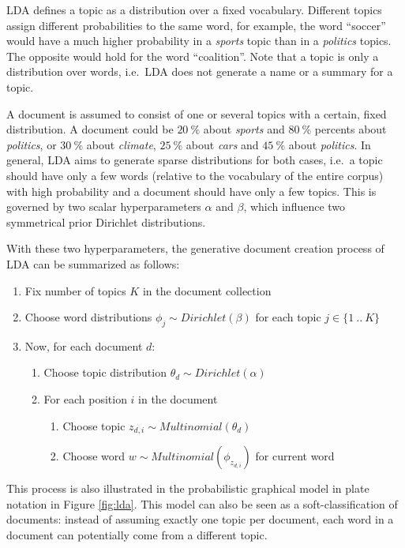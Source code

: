 \documentclass{sig-alternate-05-2015}
\begin{document}
LDA defines a topic as a distribution over a fixed vocabulary.
Different topics assign different probabilities to the same word, for example, the word ``soccer'' would have a much higher probability in a \emph{sports} topic than in a \emph{politics} topics.
The opposite would hold for the word ``coalition''.
Note that a topic is only a distribution over words, i.e.\ LDA does not generate a name or a summary for a topic.

A document is assumed to consist of one or several topics with a certain, fixed distribution.
A document could be $20~\%$ about \emph{sports} and $80~\%$ percents about \emph{politics}, or $30~\%$ about \emph{climate}, $25~\%$ about \emph{cars} and $45~\%$ about \emph{politics}.
In general, LDA aims to generate sparse distributions for both cases, i.e.\ a topic should have only a few words (relative to the vocabulary of the entire corpus) with high probability and a document should have only a few topics.
This is governed by two scalar hyperparameters $\alpha$ and $\beta$, which influence two symmetrical prior Dirichlet distributions.

With these two hyperparameters, the generative document creation process of LDA can be summarized as follows:
\begin{enumerate}
       \item Fix number of topics $K$ in the document collection
       \item Choose word distributions $\phi_j \sim Dirichlet(\beta)$ for each topic $j \in \{1~..~K\}$
       \item Now, for each document $d$:
       \begin{enumerate}
              \item Choose topic distribution $\theta_d \sim Dirichlet(\alpha)$
              \item For each position $i$ in the document
              \begin{enumerate}
                     \item Choose topic $z_{d,i} \sim Multinomial(\theta_d)$
                     \item Choose word $w \sim Multinomial(\phi_{z_{d,i}})$ for current word
              \end{enumerate}
       \end{enumerate}
\end{enumerate}
This process is also illustrated in the probabilistic graphical model in plate notation in Figure \ref{fig:lda}.
This model can also be seen as a soft-classification of documents: instead of assuming exactly one topic per document, each word in a document can potentially come from a different topic.
\end{document}
